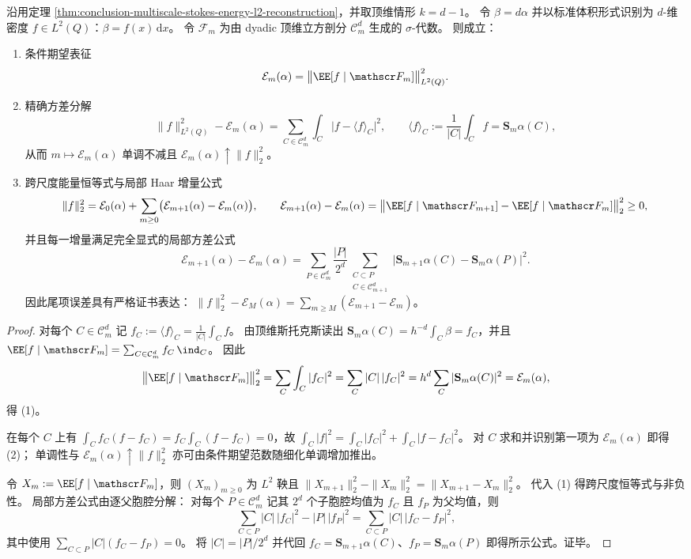 \begin{theorem}\label{thm:conclusion-stokes-energy-dyadic-martingale}
沿用定理 \ref{thm:conclusion-multiscale-stokes-energy-l2-reconstruction}，并取顶维情形 \(k=d-1\)。
令 \(\beta=d\alpha\) 并以标准体积形式识别为 \(d\)-维密度 \(f\in L^2(Q)\)：\(\beta=f(x)\,\mathrm dx\)。
令 \(\mathscr F_m\) 为由 dyadic 顶维立方剖分 \(\mathcal C_m^{d}\) 生成的 \(\sigma\)-代数。
则成立：
\begin{enumerate}
  \item 条件期望表征
  \[
  \mathcal E_m(\alpha)=\bigl\|\EE[f\mid \mathscr F_m]\bigr\|_{L^2(Q)}^2.
  \]
  \item 精确方差分解
  \[
  \|f\|_{L^2(Q)}^2-\mathcal E_m(\alpha)
  =\sum_{C\in\mathcal C_m^{d}}\int_C\bigl|f-\langle f\rangle_C\bigr|^2,
  \qquad
  \langle f\rangle_C:=\frac1{|C|}\int_C f=\mathbf S_m\alpha(C),
  \]
  从而 \(m\mapsto \mathcal E_m(\alpha)\) 单调不减且 \(\mathcal E_m(\alpha)\uparrow \|f\|_2^2\)。
  \item 跨尺度能量恒等式与局部 Haar 增量公式
  \[
  \|f\|_2^2=\mathcal E_0(\alpha)+\sum_{m\ge 0}\bigl(\mathcal E_{m+1}(\alpha)-\mathcal E_m(\alpha)\bigr),
  \qquad
  \mathcal E_{m+1}(\alpha)-\mathcal E_m(\alpha)
  =\bigl\|\EE[f\mid\mathscr F_{m+1}]-\EE[f\mid\mathscr F_m]\bigr\|_2^2\ge 0,
  \]
  并且每一增量满足完全显式的局部方差公式
  \[
  \mathcal E_{m+1}(\alpha)-\mathcal E_m(\alpha)
  =\sum_{P\in\mathcal C_m^{d}}\frac{|P|}{2^d}\sum_{\substack{C\subset P\\ C\in\mathcal C_{m+1}^{d}}}
  \bigl|\mathbf S_{m+1}\alpha(C)-\mathbf S_m\alpha(P)\bigr|^2.
  \]
  因此尾项误差具有严格证书表达：
  \(
  \|f\|_2^2-\mathcal E_M(\alpha)=\sum_{m\ge M}(\mathcal E_{m+1}-\mathcal E_m)
  \)。
\end{enumerate}
\end{theorem}
\begin{proof}
对每个 \(C\in\mathcal C_m^{d}\) 记 \(f_C:=\langle f\rangle_C=\frac1{|C|}\int_C f\)。
由顶维斯托克斯读出 \(\mathbf S_m\alpha(C)=h^{-d}\int_C\beta=f_C\)，并且
\(
\EE[f\mid\mathscr F_m]=\sum_{C\in\mathcal C_m^{d}} f_C\,\ind_C
\)。
因此
\[
\bigl\|\EE[f\mid\mathscr F_m]\bigr\|_2^2
=\sum_{C}\int_C |f_C|^2
=\sum_C |C|\,|f_C|^2
=h^d\sum_C |\mathbf S_m\alpha(C)|^2
=\mathcal E_m(\alpha),
\]
得 (1)。
\par
在每个 \(C\) 上有 \(\int_C f_C(f-f_C)=f_C\int_C(f-f_C)=0\)，故
\(
\int_C|f|^2=\int_C|f_C|^2+\int_C|f-f_C|^2
\)。
对 \(C\) 求和并识别第一项为 \(\mathcal E_m(\alpha)\) 即得 (2)；
单调性与 \(\mathcal E_m(\alpha)\uparrow\|f\|_2^2\) 亦可由条件期望范数随细化单调增加推出。
\par
令 \(X_m:=\EE[f\mid\mathscr F_m]\)，则 \((X_m)_{m\ge 0}\) 为 \(L^2\) 鞅且
\(
\|X_{m+1}\|_2^2-\|X_m\|_2^2=\|X_{m+1}-X_m\|_2^2
\)。
代入 (1) 得跨尺度恒等式与非负性。
局部方差公式由逐父胞腔分解：
对每个 \(P\in\mathcal C_m^d\) 记其 \(2^d\) 个子胞腔均值为 \(f_C\) 且 \(f_P\) 为父均值，则
\[
\sum_{C\subset P}|C|\,|f_C|^2-|P|\,|f_P|^2
=\sum_{C\subset P}|C|\,|f_C-f_P|^2,
\]
其中使用 \(\sum_{C\subset P}|C|(f_C-f_P)=0\)。
将 \(|C|=|P|/2^d\) 并代回 \(f_C=\mathbf S_{m+1}\alpha(C)\)、\(f_P=\mathbf S_m\alpha(P)\) 即得所示公式。证毕。
\end{proof}

